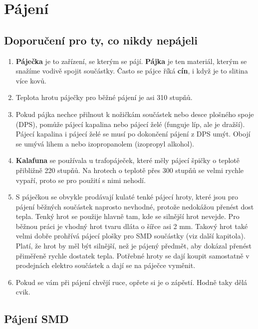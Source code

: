 \section{Pájení} 

\subsection{Doporučení pro ty, co nikdy nepájeli}

\begin{enumerate}
\item {\bf  Páječka}  je to zařízení, se kterým se pájí. {\bf Pájka}  je ten materiál, kterým se snažíme vodivě spojit součástky. Často se pájce říká {\bf cín},  i když je to slitina více kovů. 
\item Teplota hrotu páječky pro běžné pájení je asi 310 stupňů. 
\item Pokud pájka nechce přilnout k nožičkám součástek nebo desce plošného spoje (DPS), pomůže pájecí kapalina 
nebo pájecí želé (funguje líp, ale je dražší). Pájecí kapalina i pájecí želé se musí po dokončení pájení z DPS umýt. Obojí  se umývá lihem a nebo izopropanolem (izopropyl alkohol). 
\item {\bf Kalafuna}  se používala u trafopáječek, které měly pájecí špičky o teplotě přibližně 220 stupňů. 
Na hrotech o teplotě přes 300 stupňů se velmi rychle vypaří, proto se pro použití s nimi nehodí.           
\item S páječkou se obvykle prodávají kulaté tenké pájecí hroty, které jsou pro pájení běžných součástek naprosto nevhodné, protože nedokážou přenést dost tepla. Tenký hrot se použije hlavně tam, kde se silnější hrot nevejde. Pro běžnou práci je vhodný hrot tvaru dláta o šířce asi 2 mm. Takový hrot také velmi dobře prohřívá pájecí plošky pro SMD součástky (viz další kapitola). Platí, že hrot by měl být silnější, než je pájený předmět, aby dokázal přenést přiměřeně rychle dostatek tepla. Potřebné hroty se dají koupit samostatně v prodejnách elektro součástek a dají se na páječce vyměnit. 
\item Pokud se vám při pájení chvějí ruce, opřete si je o zápěstí. Hodně taky dělá cvik.   
	
\end{enumerate}


\subsection{Pájení SMD}  
 


